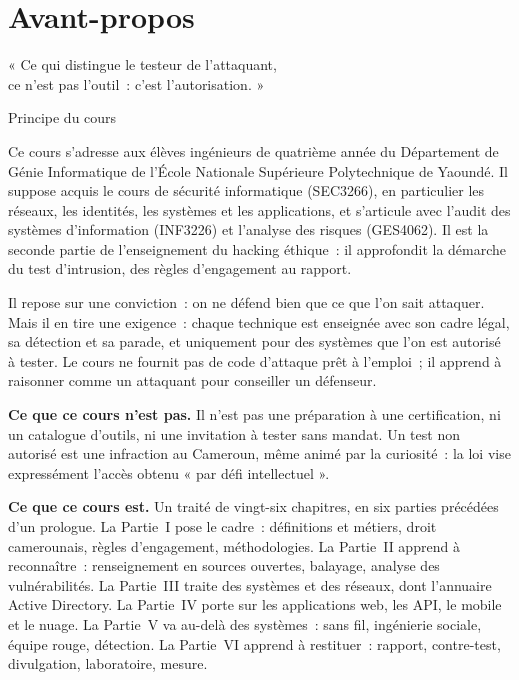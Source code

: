 
\chapter*{Avant-propos}

\epigraph{« Ce qui distingue le testeur de l'attaquant,\\
ce n'est pas l'outil~: c'est l'autorisation. »}{Principe du cours}

Ce cours s'adresse aux élèves ingénieurs de quatrième année du Département
de Génie Informatique de l'École Nationale Supérieure Polytechnique de
Yaoundé. Il suppose acquis le cours de sécurité informatique (SEC3266), en
particulier les réseaux, les identités, les systèmes et les applications, et
s'articule avec l'audit des systèmes d'information (INF3226) et l'analyse
des risques (GES4062). Il est la seconde partie de l'enseignement du hacking
éthique~: il approfondit la démarche du test d'intrusion, des règles
d'engagement au rapport.

Il repose sur une conviction~: on ne défend bien que ce que l'on sait
attaquer. Mais il en tire une exigence~: chaque technique est enseignée avec
son cadre légal, sa détection et sa parade, et uniquement pour des systèmes
que l'on est autorisé à tester. Le cours ne fournit pas de code d'attaque
prêt à l'emploi~; il apprend à raisonner comme un attaquant pour conseiller
un défenseur.

\bigskip

\textbf{Ce que ce cours n'est pas.} Il n'est pas une préparation à une
certification, ni un catalogue d'outils, ni une invitation à tester sans
mandat. Un test non autorisé est une infraction au Cameroun, même animé par
la curiosité~: la loi vise expressément l'accès obtenu « par défi
intellectuel ».

\bigskip

\textbf{Ce que ce cours est.} Un traité de vingt-six chapitres, en six
parties précédées d'un prologue. La Partie~I pose le cadre~: définitions et
métiers, droit camerounais, règles d'engagement, méthodologies. La
Partie~II apprend à reconnaître~: renseignement en sources ouvertes,
balayage, analyse des vulnérabilités. La Partie~III traite des systèmes et
des réseaux, dont l'annuaire Active Directory. La Partie~IV porte sur les
applications web, les API, le mobile et le nuage. La Partie~V va au-delà des
systèmes~: sans fil, ingénierie sociale, équipe rouge, détection. La
Partie~VI apprend à restituer~: rapport, contre-test, divulgation,
laboratoire, mesure.

